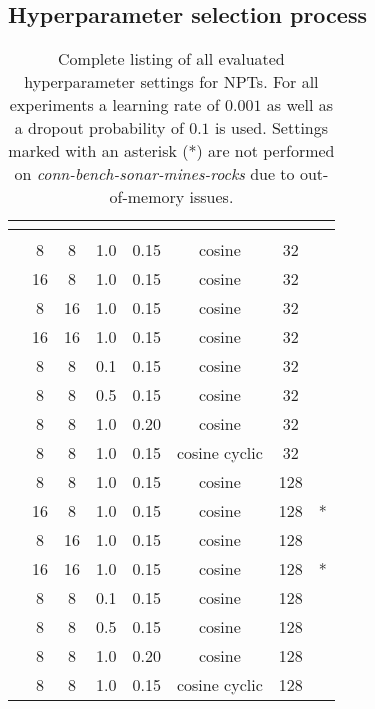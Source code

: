 \documentclass{article}
\theoremstyle{plain}
\theoremstyle{definition}
\theoremstyle{remark}
\begin{document}
\subsection{Hyperparameter selection process}\label{sec:hyperparameter_selection}
\begin{table}[ht]
    \caption{Complete listing of all evaluated hyperparameter settings for NPTs. For all experiments a learning rate of $0.001$ as well as a dropout probability of $0.1$ is used. Settings marked with an asterisk (*) are not performed on \textit{conn-bench-sonar-mines-rocks} due to out-of-memory issues.\label{tab:hyp_npt}}
    \begin{center}
        \begin{tabular}{cS[table-format=2.0]S[table-format=2.0]S[table-format=1.1]S[table-format=1.2]cS[table-format=4.0]c}
            {\bf {}} & {\bf {}} 
            & {\bf {}} & {\bf {}}
            & {\bf {}} & {\bf {}}
            & {\bf {}} & {}
            \\
            \toprule \\
             & 8 & 8 & 1.0 & 0.15 & cosine & 32 &\\
            &16 & 8 & 1.0 & 0.15 & cosine & 32 &\\
            &8 & 16 & 1.0 & 0.15 & cosine & 32 &\\
            &16 & 16 & 1.0 & 0.15 & cosine & 32 &\\
            &8 & 8 & 0.1 & 0.15 & cosine & 32 &\\
            &8 & 8 & 0.5 & 0.15 & cosine & 32 &\\
            &8 & 8 & 1.0 & 0.20 & cosine & 32 &\\
            &8 & 8 & 1.0 & 0.15 & cosine cyclic & 32 &\\ \midrule
             & 8 & 8 & 1.0 & 0.15 & cosine & 128 &\\
            &16 & 8 & 1.0 & 0.15 & cosine & 128 & *\\
            &8 & 16 & 1.0 & 0.15 & cosine & 128 &\\
            &16 & 16 & 1.0 & 0.15 & cosine & 128 & *\\
            &8 & 8 & 0.1 & 0.15 & cosine & 128 &\\
            &8 & 8 & 0.5 & 0.15 & cosine & 128 &\\
            &8 & 8 & 1.0 & 0.20 & cosine & 128 &\\
            &8 & 8 & 1.0 & 0.15 & cosine cyclic & 128 &
        \end{tabular}
    \end{center}
\end{table}
\end{document}
